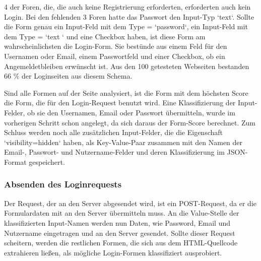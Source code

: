 4 der Foren, die, die auch keine Registrierung erforderten, erforderten auch kein Login. Bei den fehlenden 3 Foren hatte das Passwort den Input-Typ `text`.
Sollte die Form genau ein Input-Feld mit dem Type = `password`, ein Input-Feld mit dem Type = `text ` und eine Checkbox haben, ist diese Form am wahrscheinlichsten die Login-Form. Sie bestünde aus einem Feld für den Usernamen oder Email, einem Passwortfeld und einer Checkbox, ob ein Angemeldetbleiben erwünscht ist. Aus den 100 getesteten Webseiten bestanden 66 \% der Loginseiten aus diesem Schema.

Sind alle Formen auf der Seite analysiert, ist die Form mit dem höchsten Score die Form, die für den Login-Request benutzt wird. Eine Klassifizierung der Input-Felder, ob sie den Usernamen, Email oder Passwort übermitteln, wurde im vorherigen Schritt schon angelegt, da sich daraus der Form-Score berechnet. Zum Schluss werden noch alle zusätzlichen Input-Felder, die die Eigenschaft `visibility=hidden` haben, als Key-Value-Paar zusammen mit den Namen der Email-, Passwort- und Nutzername-Felder und deren Klassifizierung im JSON-Format gespeichert.

\subsubsection{Absenden des Loginrequests}
Der Request, der an den Server abgesendet wird, ist ein POST-Request, da er die Formulardaten mit an den Server übermitteln muss.
An die Value-Stelle der klassifizierten Input-Namen werden nun Daten, wie Password, Email und Nutzername eingetragen und an den Server gesendet.
Sollte dieser Request scheitern, werden die restlichen Formen, die sich aus dem HTML-Quellcode extrahieren ließen, als mögliche Login-Formen klassifiziert ausprobiert.

